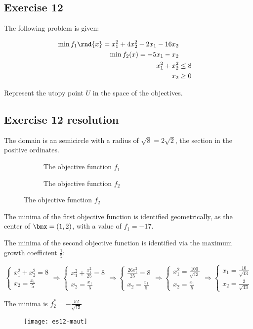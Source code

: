 \documentclass[\main/main.tex]{subfiles}
\begin{document}
\subsection{Exercise 12}
The following problem is given:

\begin{align*}
  \min f_1\rnd{x} = x_1^2 + 4x_2^2 -2x_1 -16x_2 \\
  \min f_2(x) = -5x_1 -x_2                      \\
  x_1^2 + x_2^2 & \leq 8                        \\
  x_2           & \geq 0                        \\
\end{align*}


Represent the utopy point $U$ in the space of the objectives.

\subsection{Exercise 12 resolution}
The domain is an semicircle with a radius of $\sqrt{8} = 2\sqrt{2}$, the section in the positive ordinates.

\begin{figure}
  \begin{subfigure}{0.49\textwidth}
    \caption{The objective function $f_1$}
  \end{subfigure}
  \begin{subfigure}{0.49\textwidth}
    \caption{The objective function $f_2$}
  \end{subfigure}
\end{figure}

The minima of the first objective function is identified geometrically, as the center of $\bmx = (1,2)$, with a value of $f_1 = -17$.

The minima of the second objective function is identified via the maximum growth coefficient $\frac{1}{5}$:

\[
  \begin{cases}
    x_1^2+x_2^2 = 8 \\
    x_2 = \frac{x_1}{5}
  \end{cases}
  \Rightarrow
  \begin{cases}
    x_1^2+\frac{x^2_1}{25} = 8 \\
    x_2 = \frac{x_1}{5}
  \end{cases}
  \Rightarrow
  \begin{cases}
    \frac{26x^2_1}{25} = 8 \\
    x_2 = \frac{x_1}{5}
  \end{cases}
  \Rightarrow
  \begin{cases}
    x^2_1 = \frac{100}{\sqrt{13}} \\
    x_2 = \frac{x_1}{5}
  \end{cases}
  \Rightarrow
  \begin{cases}
    x_1 = \frac{10}{\sqrt{13}} \\
    x_2 = \frac{2}{\sqrt{13}}
  \end{cases}
\]

The minima is $f_2^{*} = -\frac{52}{\sqrt{13}}$

\begin{figure}
  \texttt{[image: es12-maut]}
\end{figure}
\end{document}
